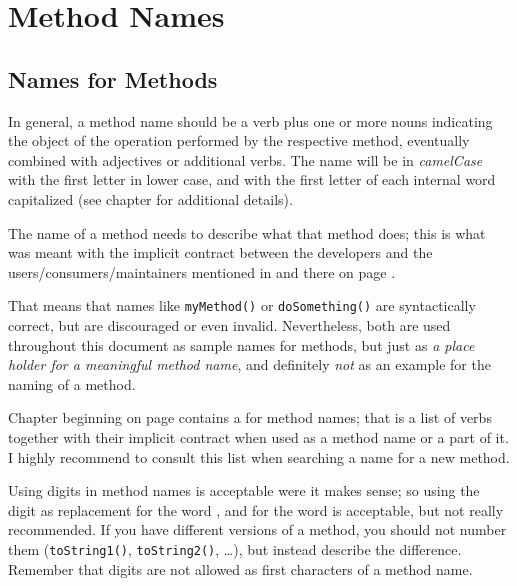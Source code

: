 \section{Method Names}\label{sec:NamesForMethods}
\subsection{Names for Methods}
In general, a method name should be a verb plus one or more nouns indicating the object of the operation performed by the respective method, eventually combined with adjectives or additional verbs. The name will be in \textit{camelCase} with the first letter in lower case, and with the first letter of each internal word capitalized (see chapter  for additional details).

The name of a method needs to describe what that method does; this is what was meant with the implicit contract between the developers and the users/consumers/maintainers mentioned in  and there on page \pageref{princ:NamingConventions:NamesAsContract}.

That means that names like \lstinline|myMethod()| or \lstinline|doSomething()| are syntactically correct, but are discouraged or even invalid. Nevertheless, both are used throughout this document as sample names for methods, but just as \textit{a place holder for a meaningful method name}, and definitely \textit{not} as an example for the naming of a method.

 Chapter  beginning on page \pageref{sec:TheNamingDictionary:Verbs} contains a  for method names; that is a list of verbs together with their implicit contract when used as a method name or a part of it. I highly recommend to consult this list when searching a name for a new method.

Using digits in method names is acceptable were it makes sense; so using the digit  as replacement for the word , and  for the word  is acceptable, but not really recommended. If you have different versions of a method, you should not number them (\lstinline|toString1()|, \lstinline|toString2()|, …), but instead describe the difference. Remember that digits are not allowed as first characters of a method name.


